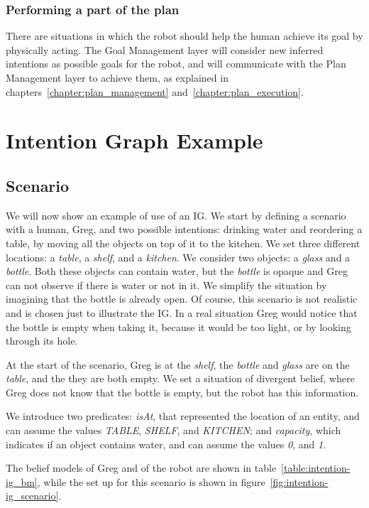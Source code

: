 \subsubsection{Performing a part of the plan}
There are situations in which the robot should help the human achieve its goal by physically acting. The Goal Management layer will consider new inferred intentions as possible goals for the robot, and will communicate with the Plan Management layer to achieve them, as explained in chapters~\ref{chapter:plan_management} and~\ref{chapter:plan_execution}. 

\section{Intention Graph Example}
\label{sec:intention-example}

\subsection{Scenario}
We will now show an example of use of an IG. We start by defining a scenario with a human, Greg, and two possible intentions: drinking water and reordering a table, by moving all the objects on top of it to the kitchen. We set three different locations: a \textit{table}, a \textit{shelf}, and a \textit{kitchen}. We consider two objects: a \textit{glass} and a \textit{bottle}. Both these objects can contain water, but the \textit{bottle} is opaque and Greg can not observe if there is water or not in it. We simplify the situation by imagining that the bottle is already open. Of course, this scenario is not realistic and is chosen just to illustrate the IG. In a real situation Greg would notice that the bottle is empty when taking it, because it would be too light, or by looking through its hole.

At the start of the scenario, Greg is at the \textit{shelf}, the \textit{bottle} and \textit{glass} are on the \textit{table}, and the they are both empty.  We set a situation of divergent belief, where Greg does not know that the bottle is empty, but the robot has this information. 

We introduce two predicates: \textit{isAt}, that represented the location of an entity, and can assume the values \textit{TABLE}, \textit{SHELF}, and \textit{KITCHEN}; and \textit{capacity}, which indicates if an object contains water, and can assume the values \textit{0}, and \textit{1}. 

The belief models of Greg and of the robot are shown in table~\ref{table:intention-ig_bm}, while the set up for this scenario is shown in figure~\ref{fig:intention-ig_scenario}.

